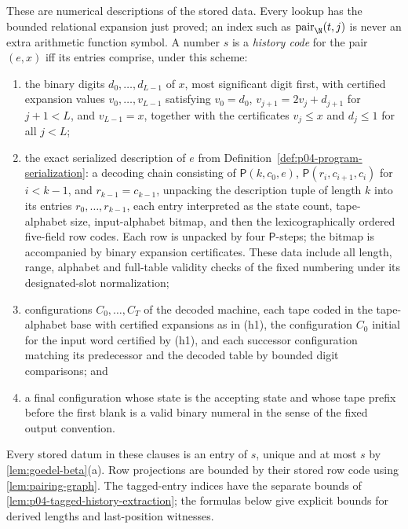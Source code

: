 \begin{definition}
These are numerical descriptions of the stored data.  Every lookup has
the bounded relational expansion just proved; an index such as
\(\operatorname{pair}_{\N}(t,j)\) is never an extra arithmetic
function symbol.  A number \(s\) is a
\emph{history code} for the pair \((e,x)\) iff its entries comprise, under
this scheme:
\begin{enumerate}[label=(h\arabic*)]
\item the binary digits \(d_0,\ldots,d_{L-1}\) of \(x\), most significant
      digit first, with certified expansion values
      \(v_0,\ldots,v_{L-1}\) satisfying \(v_0=d_0\),
      \(v_{j+1}=2v_j+d_{j+1}\) for \(j+1<L\), and \(v_{L-1}=x\), together
      with the certificates \(v_j\leq x\) and \(d_j\leq1\) for all
      \(j<L\);
\item the exact serialized description of \(e\) from
      Definition~\ref{def:p04-program-serialization}: a decoding chain consisting of
      \(\mathsf P(k,c_0,e)\), \(\mathsf P(r_i,c_{i+1},c_i)\) for
      \(i<k-1\), and \(r_{k-1}=c_{k-1}\), unpacking the description tuple of
      length \(k\) into its entries \(r_0,\ldots,r_{k-1}\), each entry
      interpreted as the state count, tape-alphabet size, input-alphabet
      bitmap, and then the lexicographically ordered five-field row codes.
      Each row is unpacked by four \(\mathsf P\)-steps; the bitmap is
      accompanied by binary expansion certificates.  These data include
      all length, range, alphabet and full-table validity checks of the fixed numbering under its
      designated-slot normalization;
\item configurations \(C_0,\ldots,C_T\) of the decoded machine, each tape
      coded in the tape-alphabet base with certified expansions as in
      (h1), the configuration \(C_0\) initial for the input word certified
      by (h1), and each successor configuration matching its predecessor
      and the decoded table by bounded digit comparisons; and
\item a final configuration whose state is the accepting state and whose
      tape prefix before the first blank is a valid binary numeral in the
      sense of the fixed output convention.
\end{enumerate}
Every stored datum in these clauses is an entry of \(s\), unique and
at most \(s\) by \cref{lem:goedel-beta}(a).  Row projections are
bounded by their stored row code using \cref{lem:pairing-graph}.
The tagged-entry indices have the separate bounds of
\cref{lem:p04-tagged-history-extraction}; the formulas below give
explicit bounds for derived lengths and last-position witnesses.
\end{definition}

